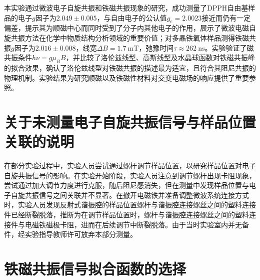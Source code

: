 \documentclass{thuemp}
\begin{document}
    本实验通过微波电子自旋共振和铁磁共振现象的研究，成功测量了DPPH自由基样品的电子$g$因子为$2.049 \pm 0.005$，与自由电子的公认值$g_e=2.0023$接近而仍有一定偏差，提示其为顺磁中心而同时受到了分子内其他电子的作用，展示了微波电磁自旋共振方法在化学中物质结构分析领域的重要价值；对多晶铁氧体样品测得铁磁共振$g$因子为$2.016 \pm 0.008$，线宽$\Delta B = \SI{1.7}{\milli\tesla}$，弛豫时间$\tau \approx \SI{262}{\nano\second}$。实验验证了磁共振条件$h\nu = g\mu_B B$，并比较了洛伦兹线型、高斯线型及水晶球函数对铁磁共振峰的拟合效果，确认了洛伦兹线型对铁磁共振的描述最为适宜，且符合其阻尼共振的物理机制。实验结果为研究顺磁以及铁磁性材料对交变电磁场的响应提供了重要参照。
    
    
    
    \renewcommand\refname{\heiti\wuhao\centerline{参考文献}\global\def\refname{参考文献}}
    \vskip 12pt
    
    \let\OLDthebibliography\thebibliography
    \renewcommand\thebibliography[1]{
      \OLDthebibliography{#1}
      \setlength{\parskip}{0pt}
      \setlength{\itemsep}{0pt plus 0.3ex}
    }
    
    {
    \renewcommand{\baselinestretch}{0.9}
    \liuhao
    
    
    }
    \newpage
    \appendix
    
    \section{关于未测量电子自旋共振信号与样品位置关联的说明}
    
    在部分实验过程中，实验人员尝试通过螺杆调节样品位置，以研究样品位置对电子自旋共振信号的影响。在实验开始阶段，实验人员注意到调节螺杆出现卡阻现象，尝试通过加大调节力度进行克服，随后阻尼感消失，但在测量中发现样品位置与电子自旋共振信号之间关联并不显著。在撤开电磁铁并准备调整微波系统连接方式时，实验人员发现反射式谐振腔的样品位置螺杆与谐振腔连接螺丝之间的塑料连接件已经断裂脱落，推断为在调节样品位置时，螺杆与谐振腔连接螺丝之间的塑料连接件与电磁铁磁极卡阻，进而在后续调节中断裂脱落。由于当时实验室内并无备件，经实验指导教师许可放弃本部分测量。
    
    \section{铁磁共振信号拟合函数的选择}
    
\end{document}
